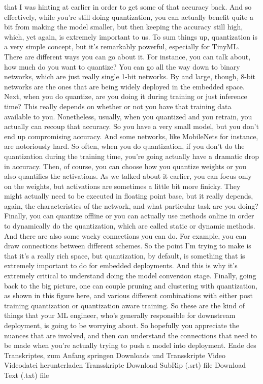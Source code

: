 {{{{{    that I was hinting at earlier in order to get some of that accuracy back.
    And so effectively, while you're still doing quantization,
    you can actually benefit quite a bit from making the model smaller,
    but then keeping the accuracy still high,
    which, yet again, is extremely important to us.
    To sum things up, quantization is a very simple concept,
    but it's remarkably powerful, especially for TinyML.
    There are different ways you can go about it.
    For instance, you can talk about, how much do you want to quantize?
    You can go all the way down to binary networks, which
    are just really single 1-bit networks.
    By and large, though, 8-bit networks are the ones
    that are being widely deployed in the embedded space.
    Next, when you do quantize, are you doing it
    during training or just inference time?
    This really depends on whether or not you have
    that training data available to you.
    Nonetheless, usually, when you quantized and you retrain,
    you actually can recoup that accuracy.
    So you have a very small model, but you don't end up compromising accuracy.
    And some networks, like MobileNets for instance, are notoriously hard.
    So often, when you do quantization, if
    you don't do the quantization during the training time,
    you're going actually have a dramatic drop in accuracy.
    Then, of course, you can choose how you quantize weights
    or you also quantifies the activations.
    As we talked about it earlier, you can focus only on the weights,
    but activations are sometimes a little bit more finicky.
    They might actually need to be executed in floating point base,
    but it really depends, again, the characteristics of the network,
    and what particular task are you doing?
    Finally, you can quantize offline or you can actually
    use methods online in order to dynamically do the quantization, which
    are called static or dynamic methods.
    And there are also some wacky connections you can do.
    For example, you can draw connections between different schemes.
    So the point I'm trying to make is that it's a really rich space,
    but quantization, by default, is something
    that is extremely important to do for embedded deployments.
    And this is why it's extremely critical to understand
    doing the model conversion stage.
    Finally, going back to the big picture, one
    can couple pruning and clustering with quantization, as shown in this figure
    here, and various different combinations with either post training quantization
    or quantization aware training.
    So these are the kind of things that your ML engineer, who's
    generally responsible for downstream deployment,
    is going to be worrying about.
    So hopefully you appreciate the nuances that are involved, and then can
    understand the connections that need to be made when you're actually
    trying to push a model into deployment.
    Ende des Transkriptes, zum Anfang springen
    Downloads und Transskripte
    Video
    Videodatei herunterladen
    Transskripte
    Download SubRip (.srt) file
    Download Text (.txt) file

}}}}}
